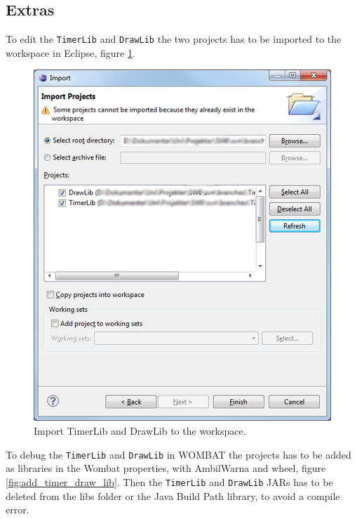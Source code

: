 \subsection*{Extras}
To edit the \texttt{TimerLib} and \texttt{DrawLib} the two projects has to be imported to the workspace in Eclipse, figure \ref{fig:import2}.

\begin{figure}[H]
	\centering
		\includegraphics[scale=0.22]{Images/how_to_wombat/import2.png}
	\caption{Import TimerLib and DrawLib to the workspace.}
	\label{fig:import2}
\end{figure}

To debug the \texttt{TimerLib} and \texttt{DrawLib} in WOMBAT the projects has to be added as libraries in the Wombat properties, with AmbilWarna and wheel, figure \ref{fig:add_timer_draw_lib}.
Then the \texttt{TimerLib} and \texttt{DrawLib} JARs has to be deleted from the libs folder or the Java Build Path library, to avoid a compile error.

